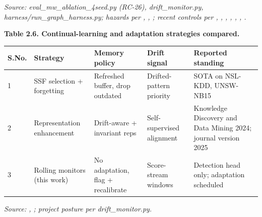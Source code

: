 {\small\textit{Source: eval\_mw\_ablation\_4seed.py (RC-26), drift\_monitor.py, harness/run\_graph\_harness.py; hazards per \cite{k4}, \cite{k28}, \cite{k30}; recent controls per \cite{k34}, \cite{k35}, \cite{k31}, \cite{k33}, \cite{k29}, \cite{k36}, \cite{k37}.}}

\begin{center}\textbf{Table 2.6. Continual-learning and adaptation strategies compared.}\end{center}

\begin{center}
\begin{tabular}{lllll}
\toprule

S.No. & Strategy & Memory policy & Drift signal & Reported standing \\

\midrule

1 & SSF selection + forgetting \cite{k34} & Refreshed buffer, drop outdated & Drifted-pattern priority & SOTA on NSL-KDD, UNSW-NB15 \\

2 & Representation enhancement \cite{k35} & Drift-aware + invariant reps & Self-supervised alignment & Knowledge Discovery and Data Mining 2024; journal version 2025 \\

3 & Rolling monitors (this work) & No adaptation, flag + recalibrate & Score-stream windows & Detection head only; adaptation scheduled \\

\bottomrule
\end{tabular}
\end{center}

{\small\textit{Source: \cite{k34}, \cite{k35}; project posture per drift\_monitor.py.}}

